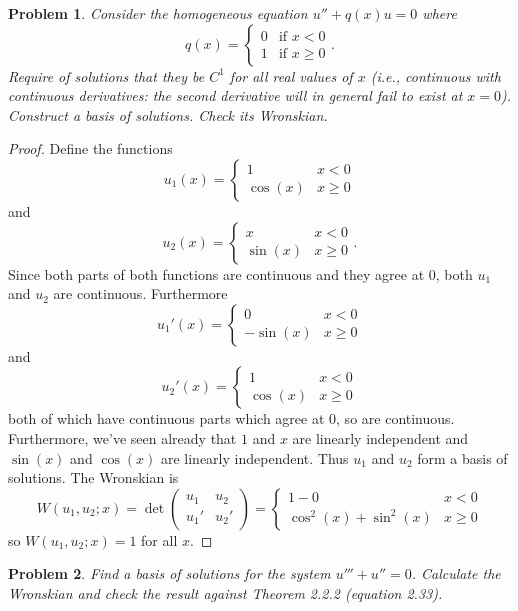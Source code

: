 \documentclass{article}
\newtheorem{problem}{Problem}
\begin{document}
\begin{problem}
Consider the homogeneous equation $u'' + q(x)u = 0$ where
\[
q(x) =
\begin{cases}
0 & \text{if $x < 0$}\\
1 & \text{if $x \geq 0$}
\end{cases}.
\]
Require of solutions that they be $C^1$ for all real values of $x$ (i.e., continuous with continuous derivatives: the second derivative will in general fail to exist at $x = 0$). Construct a basis of solutions. Check its Wronskian.
\end{problem}
\begin{proof}
Define the functions
\[
u_1(x) =
\begin{cases}
1 & x < 0\\
\cos(x) & x \geq 0
\end{cases}
\]
and
\[
u_2(x) =
\begin{cases}
x & x < 0\\
\sin(x) & x \geq 0
\end{cases}.
\]
Since both parts of both functions are continuous and they agree at $0$, both $u_1$ and $u_2$ are continuous. Furthermore
\[
u_1'(x) =
\begin{cases}
0 & x < 0\\
-\sin(x) & x \geq 0
\end{cases}
\]
and
\[
u_2'(x) =
\begin{cases}
1 & x < 0\\
\cos(x) & x \geq 0
\end{cases}
\]
both of which have continuous parts which agree at $0$, so are continuous. Furthermore, we've seen already that $1$ and $x$ are linearly independent and $\sin(x)$ and $\cos(x)$ are linearly independent. Thus $u_1$ and $u_2$ form a basis of solutions. The Wronskian is
\[
W(u_1, u_2; x) =
\det \left (
\begin{array}{cc}
u_1 & u_2\\
u_1' & u_2'
\end{array}
\right )
=
\begin{cases}
1 - 0 & x < 0\\
\cos^2(x) + \sin^2(x) & x \geq 0
\end{cases}
\]
so $W(u_1, u_2; x) = 1$ for all $x$.
\end{proof}

\begin{problem}
Find a basis of solutions for the system $u''' + u'' = 0$. Calculate the Wronskian and check the result against Theorem 2.2.2 (equation 2.33).
\end{problem}
\end{document}

